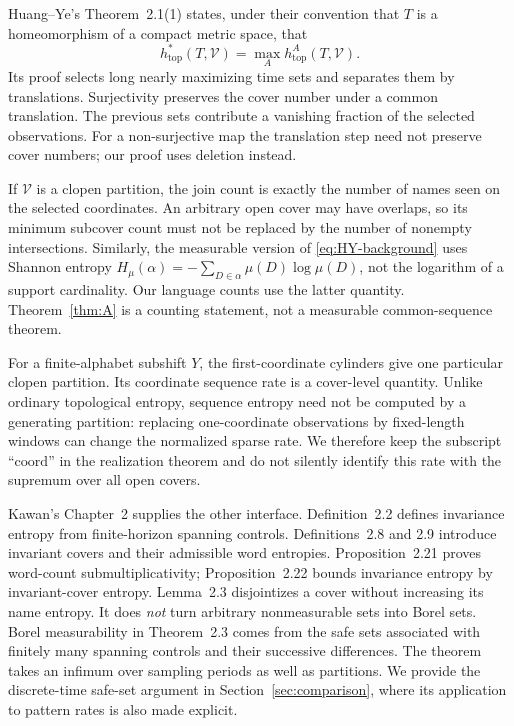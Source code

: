 \documentclass[11pt,reqno]{amsart}
\numberwithin{equation}{section}
\theoremstyle{definition}
\begin{document}
Huang--Ye's Theorem~2.1(1) states, under their convention that $T$ is a
homeomorphism of a compact metric space, that
\begin{equation}\label{eq:HY-background}
 h_{\mathrm{top}}^*(T,\mathcal V)
 =\max_A h_{\mathrm{top}}^A(T,\mathcal V).
\end{equation}
Its proof selects long nearly maximizing time sets and separates them
by translations. Surjectivity preserves the cover number under a common
translation. The previous sets contribute a vanishing fraction of the
selected observations. For a non-surjective map the translation step
need not preserve cover numbers; our proof uses deletion instead.

If $\mathcal V$ is a clopen partition, the join count is exactly the
number of names seen on the selected coordinates. An arbitrary open
cover may have overlaps, so its minimum subcover count must not be
replaced by the number of nonempty intersections. Similarly, the
measurable version of \eqref{eq:HY-background} uses Shannon entropy
$H_\mu(\alpha)=-\sum_{D\in\alpha}\mu(D)\log\mu(D)$, not the logarithm
of a support cardinality. Our language counts use the latter quantity.
Theorem~\ref{thm:A} is a counting statement, not a measurable
common-sequence theorem.

For a finite-alphabet subshift $Y$, the first-coordinate cylinders give
one particular clopen partition. Its coordinate sequence rate is a
cover-level quantity. Unlike ordinary topological entropy, sequence
entropy need not be computed by a generating partition: replacing
one-coordinate observations by fixed-length windows can change the
normalized sparse rate. We therefore keep the subscript
``$\mathrm{coord}$'' in the realization theorem and do not silently
identify this rate with the supremum over all open covers.

Kawan's Chapter~2 supplies the other interface. Definition~2.2 defines
invariance entropy from finite-horizon spanning controls.
Definitions~2.8 and 2.9 introduce invariant covers and their admissible
word entropies. Proposition~2.21 proves word-count submultiplicativity;
Proposition~2.22 bounds invariance entropy by invariant-cover entropy.
Lemma~2.3 disjointizes a cover without increasing its name entropy.
It does \emph{not} turn arbitrary nonmeasurable sets into Borel sets.
Borel measurability in Theorem~2.3 comes from the safe sets associated
with finitely many spanning controls and their successive differences.
The theorem takes an infimum over sampling periods as well as
partitions. We provide the discrete-time safe-set argument in
Section~\ref{sec:comparison}, where its application to pattern rates is
also made explicit.
\end{document}
